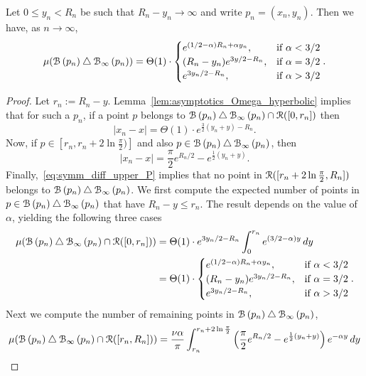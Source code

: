 \begin{lemma}\label{lem:sym_diff_measure_H_P}
Let $0 \le y_n <R_n$ be such that $R_n - y_n \to \infty$ and write $p_n = (x_n, y_n)$. Then we have, as $n \to \infty$,
\[
	\mu ({\mathcal B}\left(p_n\right) \bigtriangleup {\mathcal B}_{\infty}\left(p_n\right) ) 
	= \Theta (1) \cdot \begin{cases} 
		e^{(1/2-\alpha)R_n + \alpha y_n}, & \mbox{if } \alpha < 3/2 \\
		(R_n-y_n) e^{3y/2 - R_n}, & \mbox{if }\alpha = 3/2\\
		e^{3y_n/2 - R_n}, &  \mbox{if } \alpha > 3/2 
	\end{cases}.
\]
\end{lemma}

\begin{proof}
Let $r_n := R_n - y$. Lemma~\ref{lem:asymptotics_Omega_hyperbolic} implies that for such a $p_n$, if a point $p$ belongs to ${\mathcal B}\left(p_n\right) \bigtriangleup {\mathcal B}_{\infty}\left(p_n\right) \cap {\mathcal R} ([0,r_n])$ then 
\[
	|x_n - x| = \Theta(1) \cdot e^{\frac{3}{2} (y_n + y) - R_n}.
\]
Now, if $p \in [r_n, r_n + 2 \ln \frac{\pi}{2})]$ and also $p \in {\mathcal B}\left(p_n\right) \bigtriangleup {\mathcal B}_{\infty}\left(p_n\right)$, then 
\[
	|x_n-x| =\frac{\pi}{2} e^{R_n/2} - e^{\frac{1}{2} (y_n + y)}.
\]
Finally,~\eqref{eq:symm_diff_upper_P} implies that no point in ${\mathcal R} ([r_n+2\ln \frac{\pi}{2},R_n])$ belongs to ${\mathcal B}\left(p_n\right) \bigtriangleup {\mathcal B}_{\infty}\left(p_n\right)$. We first compute the expected number of points in $p \in {\mathcal B}\left(p_n\right) \bigtriangleup {\mathcal B}_{\infty}\left(p_n\right)$ that have $R_n - y \le r_n$. The result depends on the value of $\alpha$, yielding the following three cases
\begin{align*}
	\mu ({\mathcal B}\left(p_n\right) \bigtriangleup {\mathcal B}_{\infty}\left(p_n\right) \cap {\mathcal R} ([0,r_n])) 
	&= \Theta(1) \cdot e^{3y_n/2 - R_n}\int_0^{r_n} e^{(3/2-\alpha) y} \, dy \\
	&= \Theta(1)\cdot \begin{cases} e^{(1/2-\alpha)R_n + \alpha y_n}, & \mbox{if } \alpha < 3/2 \\
		(R_n - y_n) e^{3y_n/2 - R_n}, & \mbox{if }\alpha = 3/2\\
		e^{3y_n/2 - R_n}, &  \mbox{if } \alpha > 3/2
	\end{cases}.
\end{align*}
Next we compute the number of remaining points in ${\mathcal B}\left(p_n\right) \bigtriangleup {\mathcal B}_{\infty}\left(p_n\right)$, 
\begin{align*}
	\mu (\BallHyp{p_n} \bigtriangleup \BallPo{p_n} \cap \Rcal ([r_n, R_n])) 
	&= \frac{\nu\alpha}{\pi} \int_{r_n}^{r_n + 2 \ln \frac{\pi}{2}} 
		\left(\frac{\pi}{2} e^{R_n/2} - e^{\frac{1}{2} (y_n + y)}\right)e^{-\alpha y} \, dy \\

\end{align*}
\end{proof}
